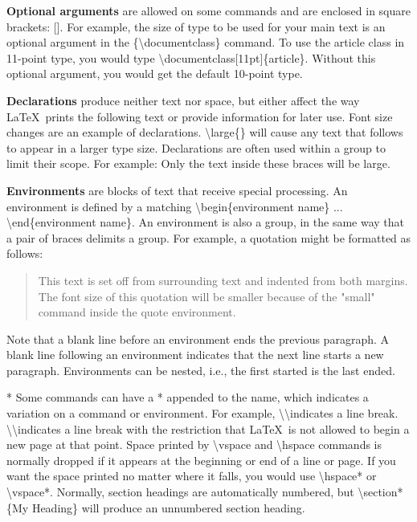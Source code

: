 \documentclass[a4paper,11pt,UTF8,openright]{book}
\begin{document}
\textbf{Optional arguments} are allowed on some commands and are enclosed in square brackets: []. For example, the size of type to be used for your main text is an optional
argument in the \{\textbackslash documentclass\} command. To use the article class in 11-point
type, you would type \textbackslash documentclass[11pt]\{article\}. Without this optional
argument, you would get the default 10-point type.


\textbf{Declarations} produce neither text nor space, but either affect the way \LaTeX\ prints the following text or provide information for later use. Font size changes are an
example of declarations. \textbackslash large\{\} will cause any text that follows to appear in a larger type size. Declarations are often used within a group to limit their scope. For
example: {\large Only the text inside these braces will be large.}


\textbf{Environments} are blocks of text that receive special processing. An environment is
defined by a matching \textbackslash begin\{environment name\} ... \textbackslash end\{environment name\}. An environment is also a group, in the same way that a pair of braces delimits a group. For example, a quotation might be formatted as follows:

	\begin{quote}
	\small
	This text is set off from surrounding text and indented from
	both margins. The font size of this quotation will be smaller
	because of the "small" command inside the quote environment.
	\end{quote}

Note that a blank line before an environment ends the previous paragraph. A blank
line following an environment indicates that the next line starts a new paragraph.
Environments can be nested, i.e., the first started is the last ended.

* Some commands can have a * appended to the name, which indicates a variation on a
command or environment. For example, \textbackslash\textbackslash indicates a line break. \textbackslash\textbackslash* indicates a
line break with the restriction that \LaTeX\ is not allowed to begin a new page at that
point. Space printed by \textbackslash vspace and \textbackslash hspace commands is normally dropped if it appears at the beginning or end of a line or page. If you want the space printed no matter where it falls, you would use \textbackslash hspace* or \textbackslash vspace*. Normally, section headings are automatically numbered, but \textbackslash section*\{My Heading\} will produce an unnumbered section heading.
\end{document}
